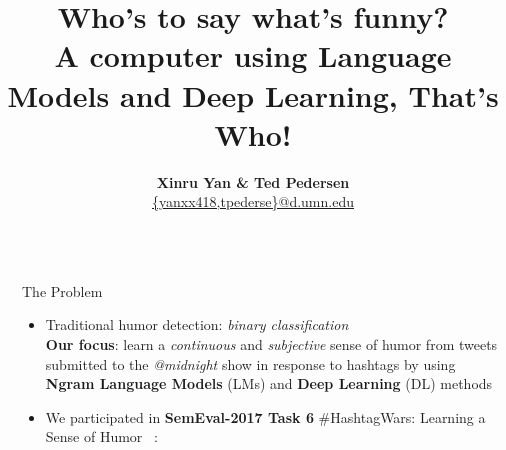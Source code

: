 \documentclass[final]{beamer}
\title{Who's to say what's funny? \\ A computer using Language Models and Deep Learning, That's Who!} %
\author{\textbf{Xinru Yan \& Ted Pedersen} \\ 
\vspace{4mm}
\normalsize \href{mailto:\{yanxx418,tpederse\}@d.umn.edu}{\{yanxx418,tpederse\}@d.umn.edu}}
\institute{Department of Computer Science University of Minnesota Duluth} %
\newlength{\sepwid}
\newlength{\onecolwid}
\begin{document}

\setlength{\belowcaptionskip}{1ex} %
\setlength\belowdisplayshortskip{3ex} %

\begin{frame}[t] %

\begin{columns}[t] %

\begin{column}{\sepwid}\end{column} %

\begin{column}{\onecolwid} %


\begin{block}{The Problem}
\begin{itemize}
\item \large Traditional humor detection: \textit{binary classification} \\
\large \textbf{Our focus}: learn a \textit{continuous} and \textit{subjective} sense of humor 
from tweets submitted to the \textit{@midnight} show in response to hashtags 
by using \textbf{Ngram Language Models} (LMs) and \textbf{Deep Learning} (DL) methods 

\item We participated in \textbf{SemEval-2017 Task 6} 
\#HashtagWars: Learning a Sense of Humor ~\cite{PotashRR17}:


\end{itemize}
\end{block}
\end{column}
\end{columns}
\end{frame}
\end{document}
